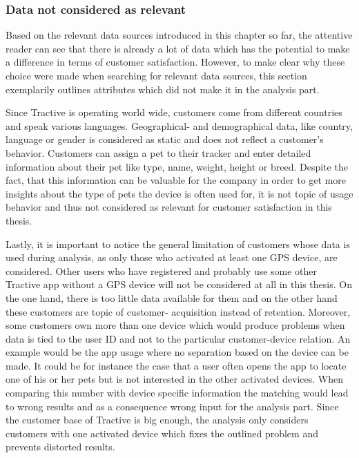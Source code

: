 \subsubsection{Data not considered as relevant}
\label{sssec:excludedData}
Based on the relevant data sources introduced in this chapter so far, the attentive reader can see that there is already a lot of data which has the potential to make a difference in terms of customer satisfaction. However, to make clear why these choice were made when searching for relevant data sources, this section exemplarily outlines attributes which did not make it in the analysis part. 

Since Tractive is operating world wide, customers come from different countries and speak various languages. Geographical- and demographical data, like country, language or gender is considered as static and does not reflect a customer's behavior. Customers can assign a pet to their tracker and enter detailed information about their pet like type, name, weight, height or breed. Despite the fact, that this information can be valuable for the company in order to get more insights about the type of pets the device is often used for, it is not topic of usage behavior and thus not considered as relevant for customer satisfaction in this thesis. 

Lastly, it is important to notice the general limitation of customers whose data is used during analysis, as only those who activated at least one GPS device, are considered. Other users who have registered and probably use some other Tractive app without a GPS device will not be considered at all in this thesis. On the one hand, there is too little data available for them and on the other hand these customers are topic of customer- acquisition instead of retention. Moreover, some customers own more than one device which would produce problems when data is tied to the user ID and not to the particular customer-device relation. An example would be the app usage where no separation based on the device can be made. It could be for instance the case that a user often opens the app to locate one of his or her pets but is not interested in the other activated devices. When comparing this number with device specific information the matching would lead to wrong results and as a consequence wrong input for the analysis part. Since the customer base of Tractive is big enough, the analysis only considers customers with one activated device which fixes the outlined problem and prevents distorted results. 

